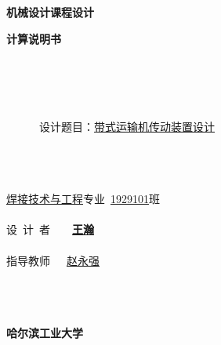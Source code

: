 \maketitle
\newpage
\begin{Huge}
	\begin{center}
		~\\
		~\\
		\textbf{机械设计课程设计}\par \textbf{计算说明书}\\
		~\\
		~\\
	\end{center}
\end{Huge}
\begin{Large}
	~\\
	~\\
	~~~~~~设计题目：\underline{带式运输机传动装置设计}
	~\\
	~\\
\end{Large}
\begin{Large}
	\begin{center}
		~\\
		~\\
		\underline{焊接技术与工程}专业~\underline{1929101}班 \\
		~\\
		设~计~者~~~~\textbf{\underline{王\quad 瀚}} \\
		~\\
		指导教师~~~\underline{赵永强} \\
		~\\
		\date{\today}
		~\\
		~\\
		\Large{\textbf{哈尔滨工业大学}}
	\end{center}
\end{Large}